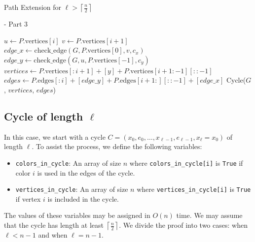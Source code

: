 \begin{algorithm}[H]
    \caption{Path Extension for \( \ell > \left \lceil \frac{n}{2} \right \rceil \)} - Part 3
    \begin{algorithmic}[1]
         
                \State $u \gets P.\text{vertices}[i]$
                \State $v \gets P.\text{vertices}[i + 1]$
                \State $edge\_x \gets \text{check\_edge}(G, P.\text{vertices}[0], v, c_x)$
                \State $edge\_y \gets \text{check\_edge}(G, u, P.\text{vertices}[-1], c_y)$
                    \State $vertices \gets P.\text{vertices}[:i + 1] + [y] + P.\text{vertices}[i + 1:-1][::-1]$
                    \State $edges \gets P.\text{edges}[:i] + [edge\_y] + P.\text{edges}[i + 1:][::-1] + [edge\_x]$
                    \State \Return Cycle($G$, $vertices$, $edges$)
                \EndIf
            \EndFor
            \State \Return {} 
        \EndFunction
    \end{algorithmic}
\end{algorithm}


\subsection{Cycle of length \( \ell \)}

In this case, we start with a cycle \( C = (x_0, e_0, \dots, x_{\ell-1}, e_{\ell-1}, x_{\ell} = x_0) \) of length \( \ell \).
To assist the process, we define the following variables:

\begin{itemize}
    \item \texttt{colors\_in\_cycle}: An array of size \( n \) where \texttt{colors\_in\_cycle[i]} is \texttt{True} if color \( i \) is used in the edges of the cycle.
    \item \texttt{vertices\_in\_cycle}: An array of size \( n \) where \texttt{vertices\_in\_cycle[i]} is \texttt{True} if vertex \( i \) is included in the cycle.
\end{itemize}

The values of these variables may be assigned in \( O(n) \) time. We may assume that the cycle has length at least \( \left \lceil \frac{n}{2} \right \rceil \).
We divide the proof into two cases: when \( \ell < n - 1 \) and when \( \ell = n - 1 \).

